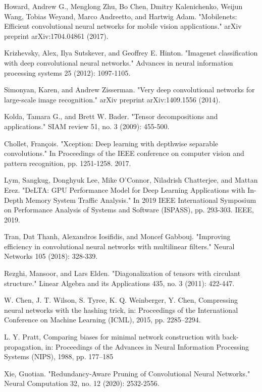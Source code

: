 \documentclass{report}
\begin{document}
\begin{thebibliography}{1}
	
	Howard, Andrew G., Menglong Zhu, Bo Chen, Dmitry Kalenichenko, Weijun Wang, Tobias Weyand, Marco Andreetto, and Hartwig Adam. "Mobilenets: Efficient convolutional neural networks for mobile vision applications." arXiv preprint arXiv:1704.04861 (2017).
	
	Krizhevsky, Alex, Ilya Sutskever, and Geoffrey E. Hinton. "Imagenet classification with deep convolutional neural networks." Advances in neural information processing systems 25 (2012): 1097-1105.
	
	Simonyan, Karen, and Andrew Zisserman. "Very deep convolutional networks for large-scale image recognition." arXiv preprint arXiv:1409.1556 (2014).
	
	Kolda, Tamara G., and Brett W. Bader. "Tensor decompositions and applications." SIAM review 51, no. 3 (2009): 455-500.

Chollet, François. "Xception: Deep learning with depthwise separable convolutions." In Proceedings of the IEEE conference on computer vision and pattern recognition, pp. 1251-1258. 2017.

		Lym, Sangkug, Donghyuk Lee, Mike O'Connor, Niladrish Chatterjee, and Mattan Erez. "DeLTA: GPU Performance Model for Deep Learning Applications with In-Depth Memory System Traffic Analysis." In 2019 IEEE International Symposium on Performance Analysis of Systems and Software (ISPASS), pp. 293-303. IEEE, 2019.
		
	Tran, Dat Thanh, Alexandros Iosifidis, and Moncef Gabbouj. "Improving efficiency in convolutional neural networks with multilinear filters." Neural Networks 105 (2018): 328-339.
	
Rezghi, Mansoor, and Lars Elden. "Diagonalization of tensors with circulant structure." Linear Algebra and its Applications 435, no. 3 (2011): 422-447.

W. Chen, J. T. Wilson, S. Tyree, K. Q. Weinberger, Y. Chen, Compressing neural networks with the hashing trick, in:
Proceedings of the International Conference on Machine Learning (ICML), 2015, pp. 2285–2294.


L. Y. Pratt, Comparing biases for minimal network construction with back-propagation, in: Proceedings of the Advances
in Neural Information Processing Systems (NIPS), 1988, pp. 177–185

Xie, Guotian. "Redundancy-Aware Pruning of Convolutional Neural Networks." Neural Computation 32, no. 12 (2020): 2532-2556.


\end{thebibliography}
\end{document}
